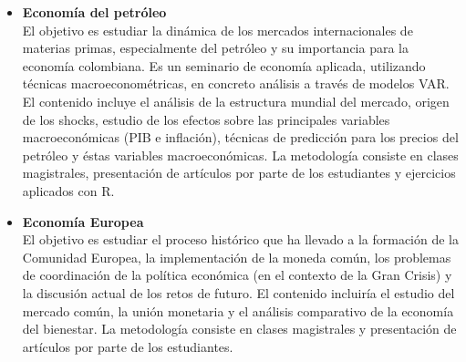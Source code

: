 \documentclass{article}\usepackage[]{graphicx}\usepackage[]{color}
\begin{document}
\begin{itemize}
  \item \textbf{Economía del petróleo}\\
El objetivo es estudiar la dinámica de los mercados internacionales de materias primas, especialmente del petróleo y su importancia para la economía colombiana. Es un seminario de economía aplicada, utilizando técnicas macroeconométricas, en concreto análisis a través de modelos VAR. El contenido incluye el análisis de la estructura mundial del mercado, origen de los shocks, estudio de los efectos sobre las principales variables macroeconómicas (PIB e inflación), técnicas de predicción para los precios del petróleo y éstas variables macroeconómicas. La metodología consiste en clases magistrales, presentación de artículos por parte de los estudiantes y ejercicios aplicados con R.

  \item \textbf{Economía Europea}\\
El objetivo es estudiar el proceso histórico que ha llevado a la formación de la Comunidad Europea, la implementación de la moneda común, los problemas de coordinación de la política económica (en el contexto de la Gran Crisis) y la discusión actual de los retos de futuro. El contenido incluiría el estudio del mercado común, la unión monetaria y el análisis comparativo de la economía del bienestar. La metodología consiste en clases magistrales y presentación de artículos por parte de los estudiantes.
\end{itemize}
\end{document}
